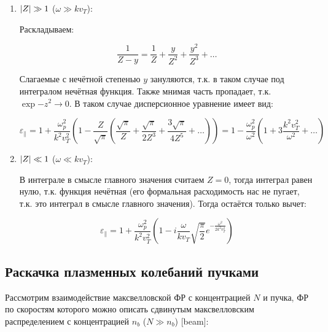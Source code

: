 \documentclass[10pt, a4paper]{article}
\begin{document}
\begin{enumerate}
	
	\item $\abs{Z} \gg 1$ ($\omega \gg kv_T$):
	
	Раскладываем:
	
	\begin{equation*}
		\frac{1}{Z-y} = \frac{1}{Z} + \frac{y}{Z^2} + \frac{y^2}{Z^3} + \ldots
	\end{equation*}
	
	Слагаемые с нечётной степенью $y$ зануляются, т.к. в таком случае под интегралом нечётная функция. Также мнимая часть пропадает, т.к. $\exp{-z^2}\rightarrow 0$. В таком случае дисперсионное уравнение имеет вид:
	
	\begin{equation} \label{eq:Landau_damp_Maxw_big_omega}
		\varepsilon_\parallel = 1 + \frac{\omega_p^2}{k^2 v_T^2} \left( 1 - \frac{Z}{\sqrt{\pi}}\left( \frac{\sqrt{\pi}}{Z} + \frac{\sqrt{\pi}}{2Z^3} + \frac{3\sqrt{\pi}}{4Z^5} + \ldots \right) \right)	= 1 - \frac{\omega_p^2}{\omega^2}\left( 1 + 3\frac{k^2 v_T^2}{\omega^2} + \ldots \right)
	\end{equation}	
	
	\item $\abs{Z} \ll 1$ ($\omega \ll kv_T$):
	
	В интеграле в смысле главного значения считаем $Z = 0$, тогда интеграл равен нулю, т.к. функция нечётная (его формальная расходимость нас не пугает, т.к. это интеграл в смысле главного значения). Тогда остаётся только вычет:
	
	\begin{equation} \label{eq:Landau_damp_Maxw_small_omega}
		\varepsilon_\parallel = 1 + \frac{\omega_p^2}{k^2 v_T^2} \left(1 - i \frac{\omega}{kv_T}\sqrt{\frac{\pi}{2}}e^{-\frac{\omega^2}{2k^2v_T^2}} \right)
	\end{equation}
	
\end{enumerate}

\subsection{Раскачка плазменных колебаний пучками} \label{subsec:plasma_beam_interaction}

Рассмотрим взаимодействие максвелловской ФР с концентрацией $N$ и пучка, ФР по скоростям которого можно описать сдвинутым максвелловским распределением с концентрацией $n_b$ ($N\gg n_b$) [beam]:
\end{document}

